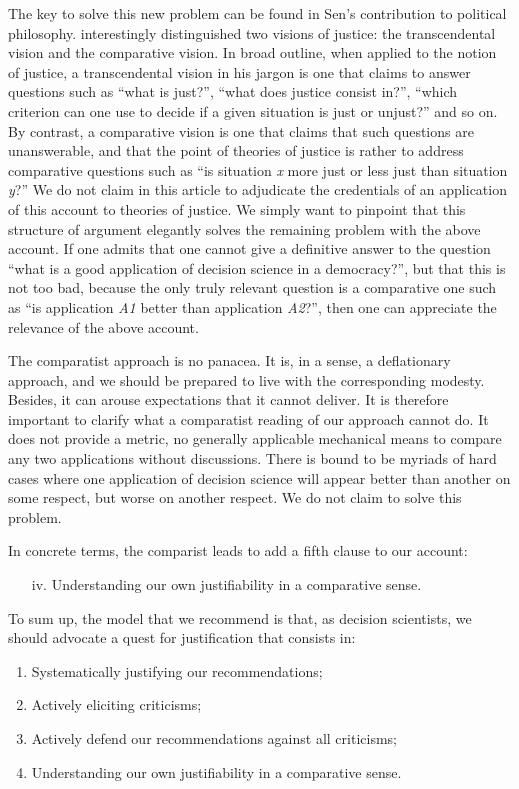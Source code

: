 \documentclass[preprint, french, english, 11pt, authoryear]{elsarticle}%
\begin{document}
The key to solve this new problem can be found in Sen's contribution to political philosophy. \cite{sen_idea_2009} interestingly distinguished two visions of justice: the transcendental vision and the comparative vision. In broad outline, when applied to the notion of justice, a transcendental vision in his jargon is one that claims to answer questions such as ``what is just?'', ``what does justice consist in?'', ``which criterion can one use to decide if a given situation is just or unjust?'' and so on. By contrast, a comparative vision is one that claims that such questions are unanswerable, and that the point of theories of justice is rather to address comparative questions such as ``is situation \emph{x} more just or less just than situation \emph{y}?'' We do not claim in this article to adjudicate the credentials of an application of this account to theories of justice. We simply want to pinpoint that this structure of argument elegantly solves the remaining problem with the above account. If one admits that one cannot give a definitive answer to the question ``what is a good application of decision science in a democracy?'', but that this is not too bad, because the only truly relevant question is a comparative one such as ``is application \emph{A1} better than application \emph{A2}?'', then one can appreciate the relevance of the above account.

The comparatist approach is no panacea. It is, in a sense, a deflationary approach, and we should be prepared to live with the corresponding modesty. 
Besides, it can arouse expectations that it cannot deliver. It is therefore important to clarify what a comparatist reading of our approach cannot do. It does not provide a metric, no generally applicable mechanical means to compare any two applications without discussions. There is bound to be myriads of hard cases where one application of decision science will appear better than another on some respect, but worse on another respect. We do not claim to solve this problem.

In concrete terms, the comparist leads to add a fifth clause to our account:
\begin{itemize}
\item[iv.]	Understanding our own justifiability in a comparative sense.
\end{itemize}

To sum up, the model that we recommend is that, as decision scientists, we should advocate a quest for justification that consists in:
\begin{enumerate}[label=\roman*.]
	\item Systematically justifying our recommendations;
	\item Actively eliciting criticisms;
	\item Actively defend our recommendations against all criticisms;
	\item Understanding our own justifiability in a comparative sense.
\end{enumerate}
\end{document}
